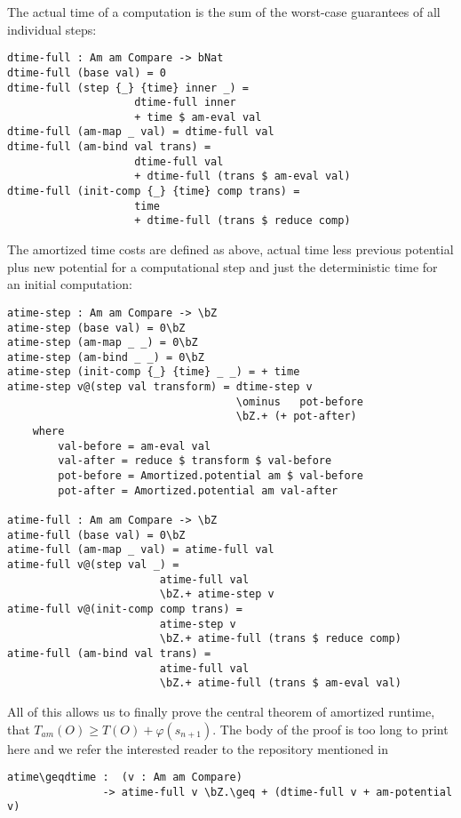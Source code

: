 The actual time of a computation is the sum of the worst-case guarantees of all individual steps:

\begin{lstlisting}[caption={Actual Time},label={lst:amortized:framework:actualtime},emph={dtime,full}]
dtime-full : Am am Compare -> bNat
dtime-full (base val) = 0
dtime-full (step {_} {time} inner _) =
                    dtime-full inner
                    + time $ am-eval val
dtime-full (am-map _ val) = dtime-full val
dtime-full (am-bind val trans) =
                    dtime-full val
                    + dtime-full (trans $ am-eval val)
dtime-full (init-comp {_} {time} comp trans) =
                    time
                    + dtime-full (trans $ reduce comp)
\end{lstlisting}

The amortized time costs are defined as above, actual time less previous potential plus new potential for a computational step and just the deterministic time for an initial computation:
\begin{lstlisting}[caption={Amortized Time},label={lst:amortized:framework:amortizedtime},emph={dtime,atime,step,full}]
atime-step : Am am Compare -> \bZ
atime-step (base val) = 0\bZ
atime-step (am-map _ _) = 0\bZ
atime-step (am-bind _ _) = 0\bZ
atime-step (init-comp {_} {time} _ _) = + time
atime-step v@(step val transform) = dtime-step v
                                    \ominus   pot-before
                                    \bZ.+ (+ pot-after)
    where
        val-before = am-eval val
        val-after = reduce $ transform $ val-before
        pot-before = Amortized.potential am $ val-before
        pot-after = Amortized.potential am val-after

atime-full : Am am Compare -> \bZ
atime-full (base val) = 0\bZ
atime-full (am-map _ val) = atime-full val
atime-full v@(step val _) =
                        atime-full val
                        \bZ.+ atime-step v
atime-full v@(init-comp comp trans) =
                        atime-step v
                        \bZ.+ atime-full (trans $ reduce comp)
atime-full (am-bind val trans) =
                        atime-full val
                        \bZ.+ atime-full (trans $ am-eval val)
\end{lstlisting}

All of this allows us to finally prove the central theorem of amortized runtime, that $T_{am}(O) \geq T(O) + \varphi(s_{n+1})$. The body of the proof is too long to print here and we refer the interested reader to the repository mentioned in 

\begin{lstlisting}[caption={Theorem: Amortized Time is an upper bound on Actual Time},emph={atime,dtime,pot,full,potential}]
atime\geqdtime :  (v : Am am Compare)
               -> atime-full v \bZ.\geq + (dtime-full v + am-potential v)
\end{lstlisting}